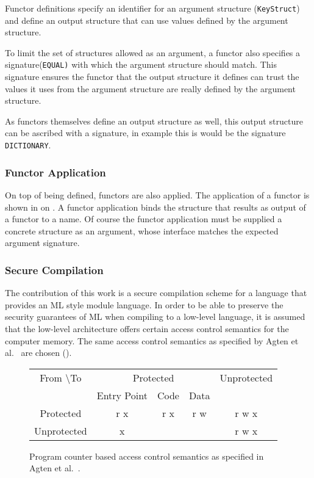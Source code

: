 \documentclass[11pt]{article}
\begin{document}
Functor definitions specify an identifier for an argument structure (\lstinline{KeyStruct}) and define an output structure that can use values defined by the argument structure. 

To limit the set of structures allowed as an argument, a functor also specifies a signature(\lstinline{EQUAL)} with which the argument structure should match.
This signature ensures the functor that the output structure it defines can trust the values it uses from the argument structure are really defined by the argument structure.

As functors themselves define an output structure as well, this output structure can be ascribed with a signature, in example  this is would be the signature \lstinline{DICTIONARY}.

\subsubsection{Functor Application}
On top of being defined, functors are also applied.
The application of a functor is shown in  on .
A functor application binds the structure that results as output of a functor to a name.
Of course the functor application must be supplied a concrete structure as an argument, whose interface matches the expected argument signature.

\subsubsection{Secure Compilation}

The contribution of this work is a secure compilation scheme for a language that provides an ML style module language.
In order to be able to preserve the security guarantees of ML when compiling to a low-level language, it is assumed that the low-level architecture offers certain access control semantics for the computer memory.
The same access control semantics as specified by Agten et al.~\cite{Agten:2012:SCM:2354412.2355247} are chosen ().

\begin{figure}[htb]
    \centering
	\begin{tabular}{|c|c|c|c|c|}
		\hline
		From \textbackslash To & \multicolumn{3}{c|}{Protected} & Unprotected \\
		& Entry Point & Code & Data & \\ \hline
		Protected & r x & r x & r w & r w x \\ \hline
		Unprotected & x & & & r w x \\ \hline
	\end{tabular}
    \caption[PCBAC Semantics]{Program counter based access control semantics as specified in Agten et al.~\cite{Agten:2012:SCM:2354412.2355247}. \label{fig:PCBAC}}
\end{figure}
\end{document}
